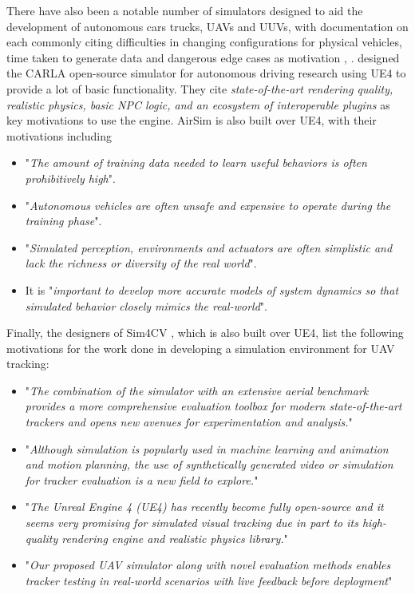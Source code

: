 There have also been a notable number of simulators designed to aid the development of autonomous cars trucks, UAVs and UUVs, with documentation on each commonly citing difficulties in changing configurations for physical vehicles, time taken to generate data and dangerous edge cases as motivation \cite{Dosovitskiy2017CARLA:Simulator} \cite{Wymann2015TORCS:Simulator}, \cite{Shah2017AirSim:Vehicles} \cite{Bojarski2016EndCars}. \citeauthor{Dosovitskiy2017CARLA:Simulator} designed the CARLA open-source simulator \cite{Dosovitskiy2017CARLA:Simulator} for autonomous driving research using UE4 to provide a lot of basic functionality. They cite \textit{state-of-the-art rendering quality, realistic physics, basic NPC logic, and an ecosystem of interoperable plugins} as key motivations to use the engine. AirSim \cite{Shah2017AirSim:Vehicles} is also built over UE4, with their motivations including
\begin{itemize}
    \item "\textit{The amount of training data needed to learn useful behaviors is often prohibitively high}".
    \item "\textit{Autonomous vehicles are often unsafe and expensive to operate during the training phase}".
    \item "\textit{Simulated perception, environments and actuators are often simplistic and lack the richness or diversity of the real world}".
    \item It is "\textit{important to develop more accurate models of system dynamics so that simulated behavior closely mimics the real-world}".
\end{itemize}

Finally, the designers of Sim4CV \cite{Mueller2016ATracking}, which is also built over UE4, list the following motivations for the work done in developing a simulation environment for UAV tracking:
\begin{itemize}
    \item "\textit{The combination of the simulator with an extensive aerial benchmark provides a more comprehensive evaluation toolbox for modern state-of-the-art trackers and opens new avenues for experimentation and analysis.}"
    \item {} "\textit{Although simulation is popularly used in machine learning and animation and motion planning, the use of synthetically generated video or simulation for tracker evaluation is a new field to explore.}"
    \item "\textit{The Unreal Engine 4 (UE4) has recently become fully open-source and it seems very promising for simulated visual tracking due in part to its high-quality rendering engine and realistic physics library.}"
    \item "\textit{Our proposed UAV simulator along with novel evaluation methods enables tracker testing in real-world scenarios with live feedback before deployment}"
\end{itemize}

